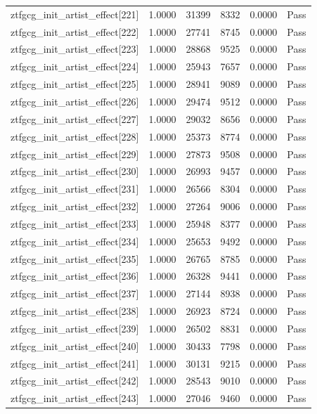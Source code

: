 \begin{table}[htbp]
\begin{tabular}{llrrll}
ztfgcg\_init\_artist\_effect[221] & 1.0000 & 31399 & 8332 & 0.0000 & Pass \\
ztfgcg\_init\_artist\_effect[222] & 1.0000 & 27741 & 8745 & 0.0000 & Pass \\
ztfgcg\_init\_artist\_effect[223] & 1.0000 & 28868 & 9525 & 0.0000 & Pass \\
ztfgcg\_init\_artist\_effect[224] & 1.0000 & 25943 & 7657 & 0.0000 & Pass \\
ztfgcg\_init\_artist\_effect[225] & 1.0000 & 28941 & 9089 & 0.0000 & Pass \\
ztfgcg\_init\_artist\_effect[226] & 1.0000 & 29474 & 9512 & 0.0000 & Pass \\
ztfgcg\_init\_artist\_effect[227] & 1.0000 & 29032 & 8656 & 0.0000 & Pass \\
ztfgcg\_init\_artist\_effect[228] & 1.0000 & 25373 & 8774 & 0.0000 & Pass \\
ztfgcg\_init\_artist\_effect[229] & 1.0000 & 27873 & 9508 & 0.0000 & Pass \\
ztfgcg\_init\_artist\_effect[230] & 1.0000 & 26993 & 9457 & 0.0000 & Pass \\
ztfgcg\_init\_artist\_effect[231] & 1.0000 & 26566 & 8304 & 0.0000 & Pass \\
ztfgcg\_init\_artist\_effect[232] & 1.0000 & 27264 & 9006 & 0.0000 & Pass \\
ztfgcg\_init\_artist\_effect[233] & 1.0000 & 25948 & 8377 & 0.0000 & Pass \\
ztfgcg\_init\_artist\_effect[234] & 1.0000 & 25653 & 9492 & 0.0000 & Pass \\
ztfgcg\_init\_artist\_effect[235] & 1.0000 & 26765 & 8785 & 0.0000 & Pass \\
ztfgcg\_init\_artist\_effect[236] & 1.0000 & 26328 & 9441 & 0.0000 & Pass \\
ztfgcg\_init\_artist\_effect[237] & 1.0000 & 27144 & 8938 & 0.0000 & Pass \\
ztfgcg\_init\_artist\_effect[238] & 1.0000 & 26923 & 8724 & 0.0000 & Pass \\
ztfgcg\_init\_artist\_effect[239] & 1.0000 & 26502 & 8831 & 0.0000 & Pass \\
ztfgcg\_init\_artist\_effect[240] & 1.0000 & 30433 & 7798 & 0.0000 & Pass \\
ztfgcg\_init\_artist\_effect[241] & 1.0000 & 30131 & 9215 & 0.0000 & Pass \\
ztfgcg\_init\_artist\_effect[242] & 1.0000 & 28543 & 9010 & 0.0000 & Pass \\
ztfgcg\_init\_artist\_effect[243] & 1.0000 & 27046 & 9460 & 0.0000 & Pass \\

\end{tabular}
\end{table}
